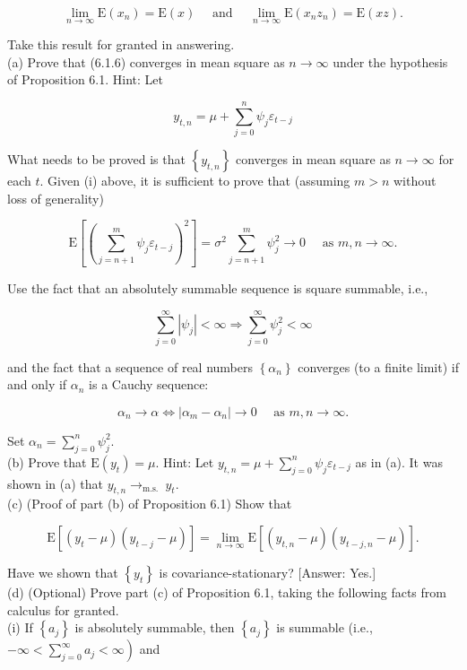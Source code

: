 \documentclass[10pt]{article}
\begin{document}
$$
\lim _{n \rightarrow \infty} \mathrm{E}\left(x_{n}\right)=\mathrm{E}(x) \quad \text { and } \quad \lim _{n \rightarrow \infty} \mathrm{E}\left(x_{n} z_{n}\right)=\mathrm{E}(x z) .
$$

Take this result for granted in answering.\\
(a) Prove that (6.1.6) converges in mean square as $n \rightarrow \infty$ under the hypothesis of Proposition 6.1. Hint: Let

$$
y_{t, n}=\mu+\sum_{j=0}^{n} \psi_{j} \varepsilon_{t-j}
$$

What needs to be proved is that $\left\{y_{t, n}\right\}$ converges in mean square as $n \rightarrow \infty$ for each $t$. Given (i) above, it is sufficient to prove that (assuming $m>n$ without loss of generality)

$$
\mathrm{E}\left[\left(\sum_{j=n+1}^{m} \psi_{j} \varepsilon_{t-j}\right)^{2}\right]=\sigma^{2} \sum_{j=n+1}^{m} \psi_{j}^{2} \rightarrow 0 \quad \text { as } m, n \rightarrow \infty .
$$

Use the fact that an absolutely summable sequence is square summable, i.e.,

$$
\sum_{j=0}^{\infty}\left|\psi_{j}\right|<\infty \Rightarrow \sum_{j=0}^{\infty} \psi_{j}^{2}<\infty
$$

and the fact that a sequence of real numbers $\left\{\alpha_{n}\right\}$ converges (to a finite limit) if and only if $\alpha_{n}$ is a Cauchy sequence:

$$
\alpha_{n} \rightarrow \alpha \Leftrightarrow\left|\alpha_{m}-\alpha_{n}\right| \rightarrow 0 \quad \text { as } m, n \rightarrow \infty .
$$

Set $\alpha_{n}=\sum_{j=0}^{n} \psi_{j}^{2}$.\\
(b) Prove that $\mathrm{E}\left(y_{t}\right)=\mu$. Hint: Let $y_{t, n}=\mu+\sum_{j=0}^{n} \psi_{j} \varepsilon_{t-j}$ as in (a). It was shown in (a) that $y_{t, n} \rightarrow_{\text {m.s. }} y_{t}$.\\
(c) (Proof of part (b) of Proposition 6.1) Show that

$$
\mathrm{E}\left[\left(y_{t}-\mu\right)\left(y_{t-j}-\mu\right)\right]=\lim _{n \rightarrow \infty} \mathrm{E}\left[\left(y_{t, n}-\mu\right)\left(y_{t-j, n}-\mu\right)\right] .
$$

Have we shown that $\left\{y_{t}\right\}$ is covariance-stationary? [Answer: Yes.]\\
(d) (Optional) Prove part (c) of Proposition 6.1, taking the following facts from calculus for granted.\\
(i) If $\left\{a_{j}\right\}$ is absolutely summable, then $\left\{a_{j}\right\}$ is summable (i.e., $-\infty< \left.\sum_{j=0}^{\infty} a_{j}<\infty\right)$ and
\end{document}
